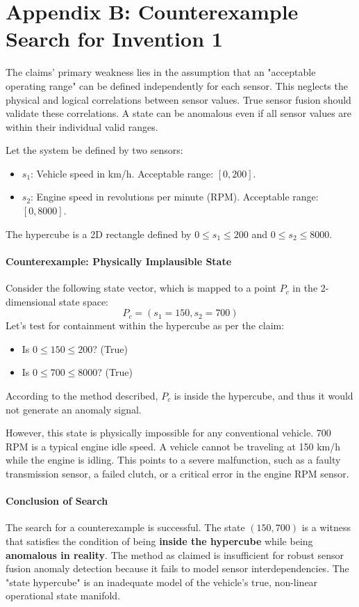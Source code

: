 \documentclass{article}
\begin{document}
\section{Appendix B: Counterexample Search for Invention 1}
The claims' primary weakness lies in the assumption that an "acceptable operating range" can be defined independently for each sensor. This neglects the physical and logical correlations between sensor values. True sensor fusion should validate these correlations. A state can be anomalous even if all sensor values are within their individual valid ranges.

Let the system be defined by two sensors:
\begin{itemize}
    \item $s_1$: Vehicle speed in km/h. Acceptable range: $[0, 200]$.
    \item $s_2$: Engine speed in revolutions per minute (RPM). Acceptable range: $[0, 8000]$.
\end{itemize}
The hypercube is a 2D rectangle defined by $0 \le s_1 \le 200$ and $0 \le s_2 \le 8000$.

\paragraph{Counterexample: Physically Implausible State}
Consider the following state vector, which is mapped to a point $P_c$ in the 2-dimensional state space:
\[ P_c = (s_1=150, s_2=700) \]
Let's test for containment within the hypercube as per the claim:
\begin{itemize}
    \item Is $0 \le 150 \le 200$? (True)
    \item Is $0 \le 700 \le 8000$? (True)
\end{itemize}
According to the method described, $P_c$ is inside the hypercube, and thus it would not generate an anomaly signal.

However, this state is physically impossible for any conventional vehicle. 700 RPM is a typical engine idle speed. A vehicle cannot be traveling at 150 km/h while the engine is idling. This points to a severe malfunction, such as a faulty transmission sensor, a failed clutch, or a critical error in the engine RPM sensor.

\paragraph{Conclusion of Search}
The search for a counterexample is successful. The state $(150, 700)$ is a witness that satisfies the condition of being \textbf{inside the hypercube} while being \textbf{anomalous in reality}. The method as claimed is insufficient for robust sensor fusion anomaly detection because it fails to model sensor interdependencies. The "state hypercube" is an inadequate model of the vehicle's true, non-linear operational state manifold.
\end{document}
